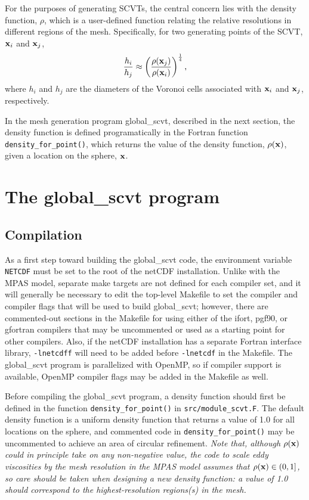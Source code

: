 \documentclass[11pt]{report}
\begin{document}
For the purposes of generating SCVTs, the central concern lies with the density function, $\rho$, which is a user-defined
function relating the relative resolutions in different regions of the mesh. Specifically, for two generating points of the 
SCVT, ${\bf x}_i$ and ${\bf x}_j$,
\[
{h_i \over h_j} \approx \left({\rho({\bf x}_j) \over \rho({\bf x}_i)} \right)^{1 \over 4},
\]
where $h_i$ and $h_j$ are the diameters of the Voronoi cells associated with ${\bf x}_i$ and ${\bf x}_j$, respectively.

In the mesh generation program global\_scvt, described in the next section, the density function is defined programatically in the Fortran function
{\tt density\_for\_point()}, which returns the value of the density function, $\rho({\bf x})$, given a location on the sphere, ${\bf x}$.
   
\section{The global\_scvt program}
\label{sec:global_scvt}

\subsection{Compilation}
                                                                                             
As a first step toward building the global\_scvt code, the environment variable                     
{\tt NETCDF} must be set to the root of the netCDF installation. Unlike with the MPAS model, separate make targets are not
defined for each compiler set, and it will generally be necessary to edit the top-level Makefile to set the compiler and compiler flags                 
that will be used to build global\_scvt; however, there are commented-out sections in the Makefile for using either of the ifort, pgf90, or gfortran compilers that may be uncommented or used as a starting point for other compilers. Also, if the netCDF installation has a separate Fortran interface library, {\tt -lnetcdff} will need to be added before {\tt -lnetcdf} in the Makefile. The global\_scvt program is parallelized with OpenMP, so if compiler support is available, OpenMP compiler flags may be added
in the Makefile as well.                      

Before compiling the global\_scvt program, a density function should first be defined in the function {\tt density\_for\_point()} in {\tt src/module\_scvt.F}. The default density function is a uniform density function that returns a value of 1.0 for all locations
on the sphere, and commented code in {\tt density\_for\_point()} may be uncommented to achieve an area of circular refinement. {\em Note that, although $\rho({\bf x})$ could in principle take on any non-negative value, the code to scale eddy viscosities by the mesh resolution in the MPAS model assumes that $\rho({\bf x}) \in (0,1]$, so care should be taken when designing a new density function: a value of 1.0 should correspond to the highest-resolution regions(s) in the mesh.}                                      
                                                                                                
\end{document}
